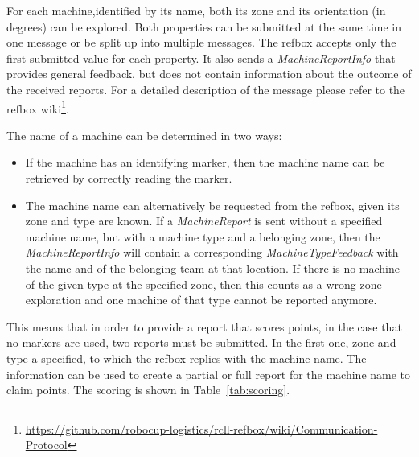 \documentclass[12pt,twoside]{article}
\newcommand{\reftab}[1]{Table~\ref{#1}}
\begin{document}
For each machine,identified by its name, both its zone and its orientation
(in degrees) can be explored.
Both properties can be submitted at the same time in one message or be split up
into multiple messages.
The \ac{refbox} accepts only the first submitted value for each property.
It also sends a \textit{MachineReportInfo} that provides general feedback,
but does not contain information about the outcome of the received reports.
For a detailed description of the message please refer to the \ac{refbox}
wiki\footnote{\url{https://github.com/robocup-logistics/rcll-refbox/wiki/Communication-Protocol}}. %

The name of a machine can be determined in two ways:
\begin{itemize}
  \item If the machine has an identifying marker, then the machine name can be
    retrieved by correctly reading the marker.
  \item The machine name can alternatively be requested from the \ac{refbox},
   given its zone and type are known.
   If a \textit{MachineReport} is sent without a specified machine name, but
   with a machine type and a belonging zone, then the \textit{MachineReportInfo}
   will contain a corresponding \textit{MachineTypeFeedback} with the name
   and of the belonging team at that location.
   If there is no machine of the given type at the specified zone, then this
   counts as a wrong zone exploration and one machine of that type cannot be
   reported anymore.
\end{itemize}
This means that in order to provide a report that scores points, in the
case that no markers are used, two reports must be submitted. In the first
one, zone and type a specified, to which the \ac{refbox} replies with the
machine name. The information can be used to create a partial or
full report for the machine name to claim points.
The scoring is shown in \reftab{tab:scoring}.
\end{document}
